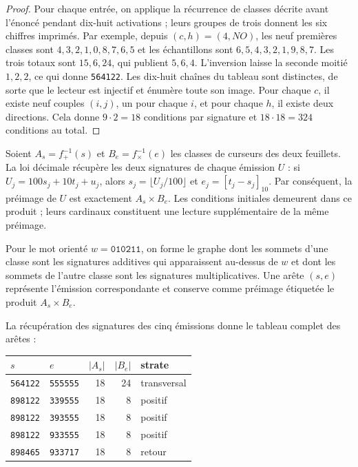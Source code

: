 \begin{proof}
Pour chaque entrée, on applique la récurrence de classes décrite avant
l'énoncé pendant dix-huit activations ; leurs groupes de trois donnent les six
chiffres imprimés. Par exemple, depuis $(c,h)=(4,NO)$, les neuf premières
classes sont $4,3,2,1,0,8,7,6,5$ et les échantillons sont
$6,5,4,3,2,1,9,8,7$. Les trois totaux sont $15,6,24$, qui publient
$5,6,4$. L'inversion laisse la seconde moitié $1,2,2$, ce qui donne
\texttt{564122}. Les dix-huit chaînes du tableau sont distinctes,
de sorte que le lecteur est injectif et énumère toute son image. Pour chaque
$c$, il existe neuf couples $(i,j)$, un pour chaque $i$, et pour chaque $h$, il existe
deux directions. Cela donne $9\cdot2=18$ conditions par signature et
$18\cdot18=324$ conditions au total.
\end{proof}

Soient $A_s=f_+^{-1}(s)$ et $B_e=f_\times^{-1}(e)$ les classes de curseurs
des deux feuillets. La loi décimale récupère les deux signatures de chaque émission
$U$ : si $U_j=100s_j+10t_j+u_j$, alors
$s_j=\lfloor U_j/100\rfloor$ et $e_j=[t_j-s_j]_{10}$.
Par conséquent, la préimage de $U$ est exactement $A_s\times B_e$.
Les conditions initiales demeurent dans ce produit ; leurs cardinaux
constituent une lecture supplémentaire de la même préimage.

\begin{definition}
Pour le mot orienté $w=\texttt{010211}$, on forme le graphe dont les
sommets d'une classe sont les signatures additives qui apparaissent au-dessus de $w$ et
dont les sommets de l'autre classe sont les signatures multiplicatives. Une
arête $(s,e)$ représente l'émission correspondante et conserve comme
préimage étiquetée le produit $A_s\times B_e$.
\end{definition}

La récupération des signatures des cinq émissions donne le tableau complet
des arêtes :
\begin{center}
\begin{tabular}{llrrl}
\toprule
$s$&$e$&$|A_s|$&$|B_e|$&strate\\
\midrule
\texttt{564122}&\texttt{555555}&18&24&transversal\\
\texttt{898122}&\texttt{339555}&18&8&positif\\
\texttt{898122}&\texttt{393555}&18&8&positif\\
\texttt{898122}&\texttt{933555}&18&8&positif\\
\texttt{898465}&\texttt{933717}&18&8&retour\\
\bottomrule
\end{tabular}
\end{center}

